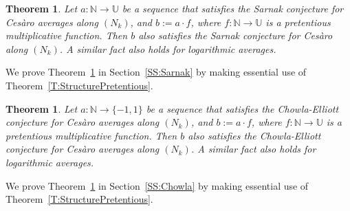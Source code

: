 \documentclass[11pt]{amsart}
\newtheorem{theorem}[lemma]{Theorem}
\theoremstyle{definition}
\newcommand{\N}{{\mathbb N}}
\newcommand{\U}{{\mathbb U}}
\begin{document}
	


\begin{theorem}\label{T:Sarnak}
Let  $a\colon \N\to \U$ be a   sequence that satisfies the Sarnak conjecture for Ces\`aro  averages along $(N_k)$, and     $b:=a\cdot f$, where $f\colon \N\to\U$ is a pretentious multiplicative function. Then  $b$ also satisfies the Sarnak conjecture  for  Ces\`aro  along $(N_k)$. A similar fact also holds for logarithmic averages.
\end{theorem}
  We prove Theorem~\ref{T:Sarnak} in Section~\ref{SS:Sarnak} by making essential use of Theorem~\ref{T:StructurePretentious}.


\begin{theorem}\label{T:Chowla}
Let $a\colon \N\to \{-1, 1\}$ be a sequence  that satisfies the  Chowla-Elliott conjecture  for Ces\`aro    averages along $(N_k)$,   and $b:=a\cdot f$, where $f\colon \N\to \U$ is a pretentious multiplicative function. Then  $b$ also satisfies the Chowla-Elliott conjecture  for  Ces\`aro   averages along $(N_k)$. A similar fact also holds for logarithmic averages.
\end{theorem}
We prove Theorem~\ref{T:Chowla} in Section~\ref{SS:Chowla} by making essential use of Theorem~\ref{T:StructurePretentious}.
\end{document}
